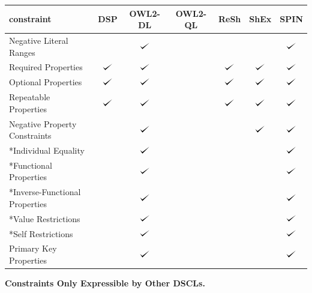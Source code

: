 \documentclass{llncs}
\def\checkmark{\tikz\fill[scale=0.4](0,.35) -- (.25,0) -- (1,.7) -- (.25,.15) -- cycle;}
\newenvironment{evaluation}{
  \scriptsize
  \sffamily
  \vspace{0.3cm}
  \begin{tabular}{l|c|c|c|c|c|c}
  \hline
  \textbf{constraint} & \textbf{DSP} & \textbf{OWL2-DL} & \textbf{OWL2-QL} & \textbf{ReSh} & \textbf{ShEx} & \textbf{SPIN} \\
  \hline

}{
  \hline
  \end{tabular}
  \linebreak
}
\begin{document}
\begin{evaluation}
Negative Literal Ranges & \ding{55} & $\checkmark$ & \ding{55} & \ding{55} & \ding{55} & $\checkmark$ \\
Required Properties & $\checkmark$ & $\checkmark$ & \ding{55} & $\checkmark$ & $\checkmark$ & $\checkmark$ \\
Optional Properties & $\checkmark$ & $\checkmark$ & \ding{55} & $\checkmark$ & $\checkmark$ & $\checkmark$ \\
Repeatable Properties & $\checkmark$ & $\checkmark$ & \ding{55} & $\checkmark$ & $\checkmark$ & $\checkmark$ \\
Negative Property Constraints & \ding{55} & $\checkmark$ & \ding{55} & & $\checkmark$ & $\checkmark$ \\
*Individual Equality & \ding{55} & $\checkmark$ & \ding{55} & \ding{55} & \ding{55} & $\checkmark$ \\
*Functional Properties & \ding{55} & $\checkmark$ & \ding{55} & \ding{55} & \ding{55} & $\checkmark$ \\
*Inverse-Functional Properties & \ding{55} & $\checkmark$ & \ding{55} & \ding{55} & \ding{55} & $\checkmark$ \\
*Value Restrictions & & $\checkmark$ & \ding{55} & & & $\checkmark$ \\
*Self Restrictions & \ding{55} & $\checkmark$ & \ding{55} & \ding{55} & \ding{55} & $\checkmark$ \\
Primary Key Properties & \ding{55} & $\checkmark$ & \ding{55} & \ding{55} & \ding{55} & $\checkmark$ \\
\end{evaluation}

\textbf{Constraints Only Expressible by Other DSCLs.}
\end{document}
